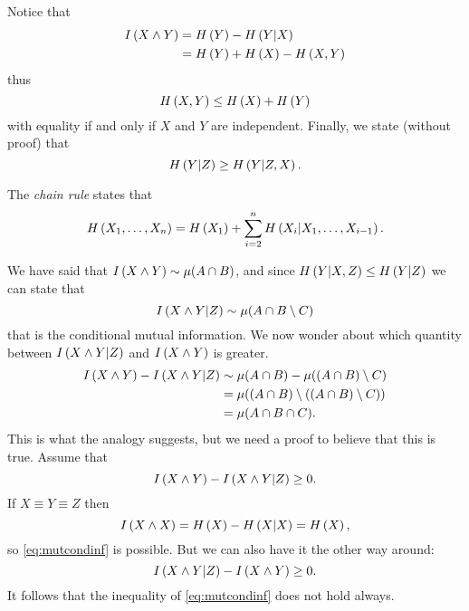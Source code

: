 Notice that
\begin{align*}
	I \left( {X \land Y} \right)
	& =
	H\left({Y}\right) - H\left({Y | X}\right)
	\\
	& =
	H\left({Y}\right) + H\left({X}\right) - H\left({X,Y}\right) 
\end{align*}
thus
\begin{equation*}
	H\left({X,Y}\right) \le H\left({X}\right) + H\left({Y}\right) 
\end{equation*}
with equality if and only if $X$ and $Y$ are independent.
Finally, we state (without proof) that
\begin{equation*}
	H\left({Y | Z}\right) \ge H\left({Y | Z, X}\right).
\end{equation*}

\begin{prop} \label{prop:chain-rule}
	The \emph{chain rule} states that
	\begin{equation*}
		H\left({X_1, \dots, X_n}\right)
		=
		H\left({X_1}\right)
		+
		\sum_{i = 2}^n H\left({X_i | X_1, \dots, X_{i-1}}\right).
	\end{equation*}
\end{prop}

We have said that $I \left( {X \land Y} \right) \sim \mu(A \cap B)$, and since $H\left({Y | X, Z}\right) \le H\left({Y|Z}\right)$ we can state that
\begin{equation*}
	I \left( {X \land Y | Z} \right)
	\sim
	\mu(A \cap B \setminus C)
\end{equation*}
that is the conditional mutual information.
We now wonder about which quantity between $I \left( {X \land Y | Z} \right)$ and $I \left( {X \land Y} \right)$ is greater.
\begin{align*}
	I \left( {X \land Y} \right) -  I \left( {X \land Y | Z} \right)
	& \sim
	\mu(A \cap B) - \mu((A \cap B) \setminus C)
	\\
	& =
	\mu((A \cap B) \setminus ((A \cap B) \setminus C))
	\\ 
	& =
	\mu(A \cap B \cap C). 
\end{align*}
This is what the analogy suggests, but we need a proof to believe that this is true.
Assume that
\begin{equation}\label{eq:mutcondinf}
	I \left( {X \land Y} \right) - I \left( {X \land Y | Z} \right) \ge 0.
\end{equation}
If $X \equiv Y \equiv Z$ then
\begin{equation*}
	I \left( {X \land X} \right) = H\left({X}\right) - H\left({X | X}\right) = H\left({X}\right),
\end{equation*}
so \cref{eq:mutcondinf} is possible.
But we can also have it the other way around:
\begin{equation*}
	I \left( {X \land Y | Z} \right) - I \left( {X \land Y} \right) \ge 0. 
\end{equation*}
It follows that the inequality of \cref{eq:mutcondinf} does not hold always.

